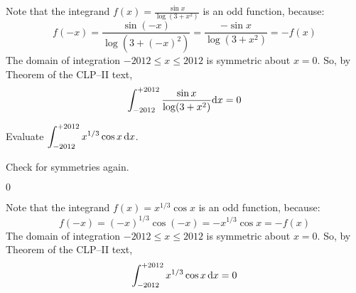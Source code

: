 \begin{solution}
Note that the integrand $f(x) = \frac{\sin x}{\log(3+x^2)}$ is an odd function, because:
\begin{equation*}
f(-x) = \frac{\sin(-x)}{\log(3+(-x)^2)}=\frac{-\sin x}{\log(3+x^2)} =- f(x)
\end{equation*}
The domain of integration $-2012 \le x \le 2012$ is symmetric about $x=0$. So,
by Theorem  of the CLP--II text,
\begin{equation*}
\int_{-2012}^{+2012} \frac{\sin x}{\log(3+x^2)}\mathrm{d}x = 0
\end{equation*}
\end{solution}

\begin{question}[2012A]
Evaluate $\displaystyle\int_{-2012}^{+2012} x^{1/3}\cos x\,\mathrm{d}x$.
\end{question}

\begin{hint}
Check for symmetries again.
\end{hint}

\begin{answer}
$0$
\end{answer}

\begin{solution}
Note that the integrand $f(x) = x^{1/3}\cos x$ is an odd function,
because:
\begin{equation*}
f(-x) = (-x)^{1/3}\cos(-x)= - x^{1/3}\cos x =- f(x)
\end{equation*}
The domain of integration $-2012 \le x \le 2012$ is symmetric about $x=0$. So,
by Theorem  of the CLP--II text,
\begin{equation*}
\int_{-2012}^{+2012}x^{1/3}\cos x\,\mathrm{d}x = 0
\end{equation*}
\end{solution}

